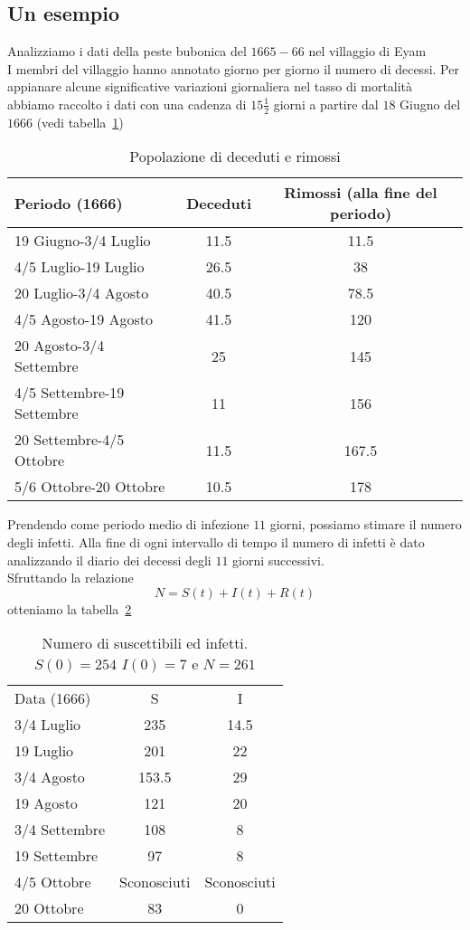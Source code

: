 \subsection{Un esempio}
Analizziamo i dati della peste bubonica del $1665-66$ nel villaggio di Eyam~\cite{raggett1982stochastic} \\
I membri del villaggio hanno annotato giorno per giorno il numero di decessi. Per appianare alcune significative variazioni giornaliera nel tasso di mortalit\`a abbiamo raccolto  i dati con una cadenza di $15 \frac{1}{2}$ giorni a partire dal $18$ Giugno del $1666$ (vedi tabella~\ref{table::1})
\begin{table}[!h]
\centering
\caption{Popolazione di deceduti e rimossi }
\label{table::1}
\begin{tabular}{l | c | c }

Periodo (1666) & Deceduti & Rimossi (alla fine del periodo) \\
\hline

19 Giugno-3/4 Luglio & 11.5 & 11.5\\
4/5 Luglio-19 Luglio & 26.5 & 38\\ 
20 Luglio-3/4 Agosto & 40.5 & 78.5\\
4/5 Agosto-19 Agosto & 41.5 & 120\\
20 Agosto-3/4 Settembre & 25 & 145\\
4/5 Settembre-19 Settembre & 11 & 156\\
20 Settembre-4/5 Ottobre & 11.5 & 167.5\\
5/6 Ottobre-20 Ottobre & 10.5 & 178\\

\end{tabular}

\end{table}

Prendendo come periodo medio di infezione  $11$ giorni, possiamo stimare il numero degli infetti. Alla fine di ogni intervallo di tempo il numero di infetti \`e dato analizzando il diario dei decessi degli $11$ giorni successivi.\\
Sfruttando la relazione 
$$ N = S(t) + I(t) + R(t)$$ 
otteniamo la tabella~\ref{table::2}




\begin{table}[!h]
\centering
\caption{Numero di suscettibili ed infetti. $S(0) = 254$ $I(0) = 7$ e $N = 261$ }	
\label{table::2}
\begin{tabular}{l|c|c}

Data (1666) & S & I\\
\cline{1-3}
3/4 Luglio  & 235& 14.5\\
19 Luglio  & 201 & 22\\
3/4 Agosto  & 153.5& 29\\
19  Agosto  & 121& 20\\
3/4 Settembre  & 108&  8\\
19 Settembre  & 97& 8\\
4/5 Ottobre  & Sconosciuti& Sconosciuti\\
20 Ottobre  & 83& 0\\
 
\end{tabular}
\end{table}

